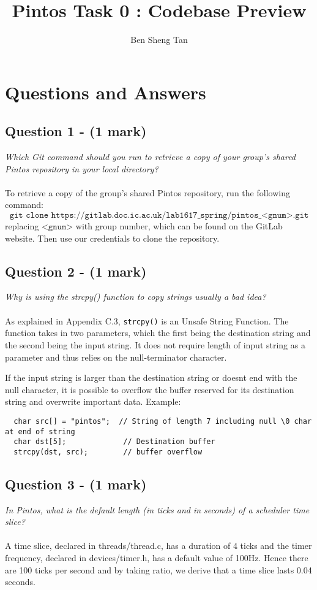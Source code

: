 \documentclass{article}
\title{Pintos Task 0 : Codebase Preview}
\author{Ben Sheng Tan}
\begin{document}
\maketitle

\section*{Questions and Answers }

\subsection*{Question 1 - (1 mark)}
\textit{Which Git command should you run to retrieve a copy of your group's shared Pintos repository in your local directory?}
\\ \\
To retrieve a copy of the group's shared Pintos repository, run the following command:
$$\texttt{git clone https://gitlab.doc.ic.ac.uk/lab1617\_spring/pintos\_<gnum>.git}$$
replacing $\texttt{<gnum>}$ with group number, which can be found on the GitLab website. Then use our credentials to clone the repository.

\subsection*{Question 2 - (1 mark)}
\textit{Why is using the strcpy() function to copy strings usually a bad idea?}
\\ \\
As explained in Appendix C.3, \texttt{strcpy()} is an Unsafe String Function. The function takes in two parameters, which the first being the destination string and the second being the input string. It does not require length of input string as a parameter and thus relies on the null-terminator character.
\par
If the input string is larger than the destination string or doesnt end with the null character, it is possible to overflow the buffer reserved for its destination string and overwrite important data. Example:
\begin{lstlisting}
  char src[] = "pintos";  // String of length 7 including null \0 char at end of string
  char dst[5];             // Destination buffer
  strcpy(dst, src);        // buffer overflow
\end{lstlisting}


\subsection*{Question 3 - (1 mark)}
\textit{In Pintos, what is the default length (in ticks and in seconds) of a scheduler time slice?}
\\ \\
A time slice, declared in threads/thread.c, has a duration of 4 ticks and the timer frequency, declared in devices/timer.h, has a default value of 100Hz. Hence there are 100 ticks per second and by taking ratio, we derive that a time slice lasts 0.04 seconds.
\end{document}
